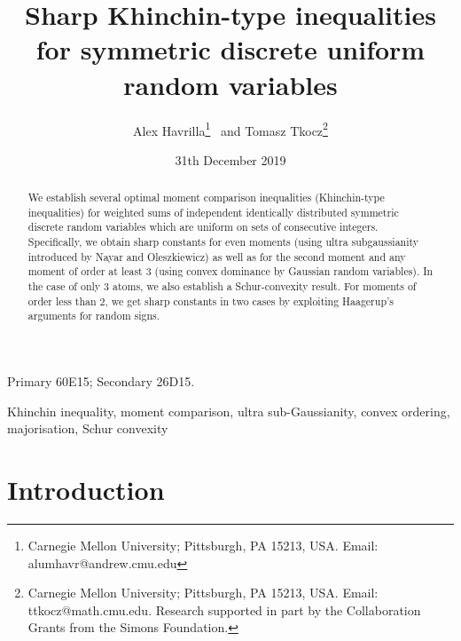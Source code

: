 \documentclass[10pt]{article}
\title{\vspace{-3em}Sharp Khinchin-type inequalities for symmetric discrete uniform random variables}
\author{Alex Havrilla\thanks{Carnegie Mellon University; Pittsburgh, PA 15213, USA. Email: alumhavr@andrew.cmu.edu}
\ and 
Tomasz Tkocz\thanks{Carnegie Mellon University; Pittsburgh, PA 15213, USA. Email: ttkocz@math.cmu.edu. Research supported in part by the Collaboration Grants from the Simons Foundation.}
}
\date{31th December 2019}
\newcommand{\1}{\textbf{1}}
\theoremstyle{remark}
\theoremstyle{definition}
\begin{document}
\maketitle

\begin{abstract}
We establish several optimal moment comparison inequalities (Khinchin-type inequalities) for weighted sums of independent identically distributed symmetric discrete random variables which are uniform on sets of consecutive integers. Specifically, we obtain sharp constants for even moments (using ultra subgaussianity introduced by Nayar and Oleszkiewicz) as well as for the second moment and any moment of order at least $3$ (using convex dominance by Gaussian random variables). In the case of only $3$ atoms, we also establish a Schur-convexity result. For moments of order less than $2$, we get sharp constants in two cases by exploiting Haagerup's arguments for random signs.
\end{abstract}

\bigskip

\begin{footnotesize}
 Primary 60E15; Secondary 26D15.

 Khinchin inequality, moment comparison, ultra sub-Gaussianity, convex ordering, majorisation, Schur convexity
\end{footnotesize}

\bigskip







\section{Introduction}
\end{document}
